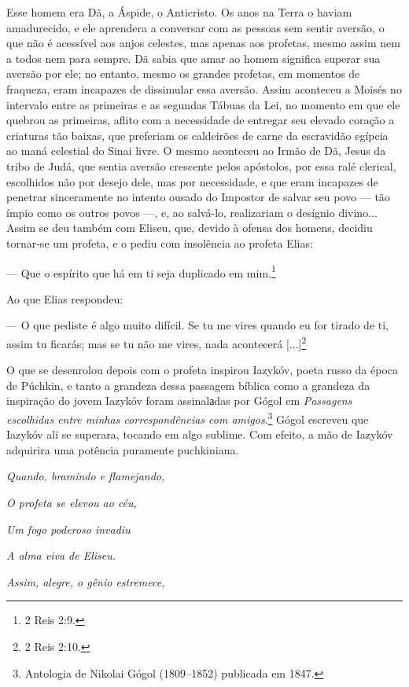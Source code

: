Esse homem era Dã, a Áspide, o Anticristo. Os anos na Terra o haviam
amadurecido, e ele aprendera a conversar com as pessoas sem sentir
aversão, o que não é acessível aos anjos celestes, mas apenas aos
profetas, mesmo assim nem a todos nem para sempre. Dã sabia que amar ao
homem significa superar sua aversão por ele; no entanto, mesmo os
grandes profetas, em momentos de fraqueza, eram incapazes de dissimular
essa aversão. Assim aconteceu a Moisés no intervalo entre as primeiras e
as segundas Tábuas da Lei, no momento em que ele quebrou as primeiras,
aflito com a necessidade de entregar seu elevado coração a criaturas tão
baixas, que preferiam os caldeirões de carne da escravidão egípcia ao
maná celestial do Sinai livre. O mesmo aconteceu ao Irmão de Dã, Jesus
da tribo de Judá, que sentia aversão crescente pelos apóstolos, por essa
ralé clerical, escolhidos não por desejo dele, mas por necessidade, e
que eram incapazes de penetrar sinceramente no intento ousado do
Impostor de salvar seu povo --- tão ímpio como os outros povos ---, e,
ao salvá-lo, realizariam o desígnio divino... Assim se deu também com
Eliseu, que, devido à ofensa dos homens, decidiu tornar-se um profeta, e
o pediu com insolência ao profeta Elias:

--- Que o espírito que há em ti seja duplicado em mim.\footnote{2 Reis
  2:9.}

Ao que Elias respondeu:

--- O que pediste é algo muito difícil. Se tu me vires quando eu for
tirado de ti, assim tu ficarás; mas se tu não me vires, nada acontecerá
{[}...{]}\footnote{2 Reis 2:10.}

O que se desenrolou depois com o profeta inspirou Iazykóv, poeta russo
da época de Púchkin, e tanto a grandeza dessa passagem bíblica como a
grandeza da inspiração do jovem Iazykóv foram assinalаdas por Gógol em
\emph{Passagens escolhidas entre minhas correspondências com
amigos}.\footnote{Antologia de Nikolai Gógol (1809\emph{--}1852)
  publicada em 1847.} Gógol escreveu que Iazykóv ali se superara,
tocando em algo sublime. Com efeito, a mão de Iazykóv adquirira uma
potência puramente puchkiniana.

\emph{Quando, bramindo e flamejando,}

\emph{O profeta se elevou ao céu,}

\emph{Um fogo poderoso invadiu}

\emph{A alma viva de Eliseu. }

\emph{Assim, alegre, o gênio estremece, }

